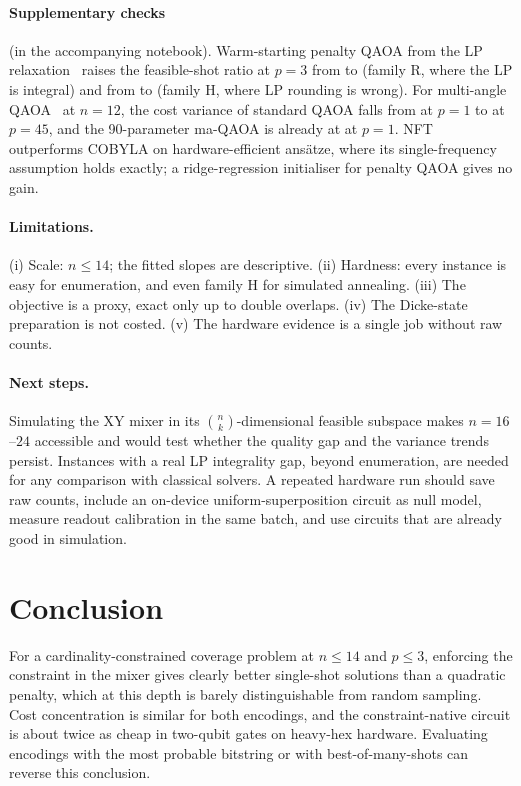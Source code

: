 \documentclass[11pt,a4paper]{article}
\begin{document}
\paragraph{Supplementary checks} (in the accompanying notebook). Warm-starting penalty QAOA from
the LP relaxation~\cite{egger2021} raises the feasible-shot ratio at $p=3$ from \StdR{} to \WsR{}
(family R, where the LP is integral) and from \StdH{} to \WsH{} (family H, where LP rounding is
wrong). For multi-angle QAOA~\cite{herrman2022} at $n=12$, the cost variance of standard QAOA falls
from \MaStdOne{} at $p=1$ to \MaStdFortyFive{} at $p=45$, and the 90-parameter ma-QAOA is already at
\MaOne{} at $p=1$. NFT~\cite{nakanishi2020} outperforms COBYLA on hardware-efficient ansätze,
where its single-frequency assumption holds exactly; a ridge-regression initialiser for penalty
QAOA gives no gain.

\paragraph{Limitations.} (i) Scale: $n\le14$; the fitted slopes are descriptive. (ii) Hardness:
every instance is easy for enumeration, and even family H for simulated annealing. (iii) The
objective is a proxy, exact only up to double overlaps. (iv) The Dicke-state preparation is not
costed. (v) The hardware evidence is a single job without raw counts.

\paragraph{Next steps.} Simulating the XY mixer in its $\binom{n}{k}$-dimensional feasible subspace
makes $n=16$--$24$ accessible and would test whether the quality gap and the variance trends
persist. Instances with a real LP integrality gap, beyond enumeration, are needed for any
comparison with classical solvers. A repeated hardware run should save raw counts, include an
on-device uniform-superposition circuit as null model, measure readout calibration in the same
batch, and use circuits that are already good in simulation.

\section{Conclusion}
For a cardinality-constrained coverage problem at $n\le14$ and $p\le3$, enforcing the constraint
in the mixer gives clearly better single-shot solutions than a quadratic penalty, which at
this depth is barely distinguishable from random sampling. Cost concentration is similar for both
encodings, and the constraint-native circuit is about twice as cheap in two-qubit gates on
heavy-hex hardware. Evaluating encodings with the most probable bitstring or with best-of-many-shots
can reverse this conclusion.
\end{document}
